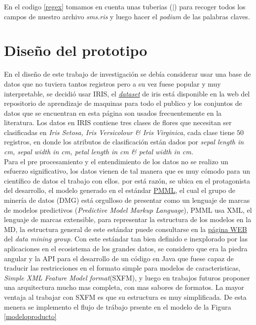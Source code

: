    En el codigo \ref{regex} tomamos en cuenta unas tuberias ($\mid$) para recoger todos los campos de nuestro archivo \textit{sms.ris} y luego hacer el \textit{podium} de las palabras claves.
  
  \section{Diseño del prototipo}
  En el diseño de este trabajo de investigación se debía considerar usar una base de datos que no tuviera tantos registros pero a su vez fuese popular y muy interpretable, se decidió usar IRIS,  el \href{https://archive.ics.uci.edu/ml/datasets/iris}{\textit{dataset}} de iris está disponible en la web del repositorio de aprendizaje de maquinas para todo el publico y los conjuntos de datos que se encuentran en esta página son usados frecuentemente en la literatura\cite{Hastie2009,Izenman2006, Farid2014, Maldonado2015, Qian2015}.
  Los datos en IRIS contiene tres clases de flores que necesitan ser clasificadas en \textit{Iris Setosa, Iris Versicolour \& Iris Virginica}, cada clase tiene $50$ registros,  en donde los atributos de clasificación están dados por \textit{sepal length in cm, sepal width in cm, petal length in cm \& petal width in cm.}\\
  Para el pre procesamiento y el entendimiento de los datos no se realizo un esfuerzo significativo, los datos vienen de tal manera que es muy cómodo para un científico de datos el trabajo con ellos. por está razón, se ubica en el protagonista del desarrollo, el modelo generado en el estándar \href{http://dmg.org/pmml/pmml_examples/index.html}{PMML}, el cual el grupo de minería de datos (DMG) está orgulloso de presentar como un lenguaje de marcas de modelos predictivos (\textit{Predictive Model Markup Language}), PMML usa XML, el lenguaje de marcas extensible, para representar la estructura de los modelos en la MD, la estructura general de este estándar puede consultarse en la \href{http://dmg.org/pmml/v4-3/GeneralStructure.html}{página WEB} del \textit{data mining group}.
  Con este estándar tan bien definido e inexplorado por las aplicaciones en el ecosistema de los grandes datos, se considero que era la piedra angular y la API para el desarrollo de un código en Java que fuese capaz de traducir las restricciones en el formato simple para modelos de caracteristicas,  \textit{Simple XML Feature Model format}(SXFM)\cite{Mendonca:2009:SSP:1639950.1640002}, y luego en trabajos futuros proponer una arquitectura mucho mas completa, con mas sabores de formatos. La mayor ventaja al trabajar con SXFM es que su estructura es muy simplificada. De esta menera se implemento el flujo de trábajo prsente en el modelo de la Figura \ref{modeloproducto} 
  
